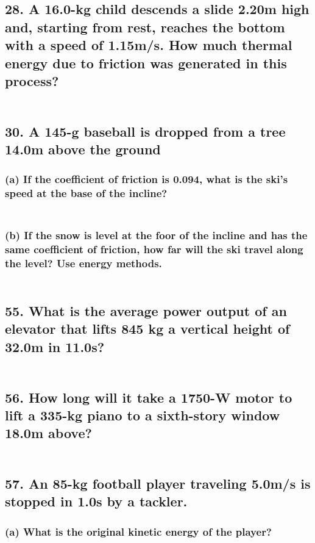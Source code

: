 \documentclass[12pt,a4paper,english]{article}
\begin{document}
\begin{flushleft}
  \subsection{28. A 16.0-kg child descends a slide 2.20m high and, starting from rest, reaches the bottom with a speed of 1.15m/s. How much thermal energy due to friction was generated in this process?}
  \begin{align*}
  \end{align*}
  \subsection{30. A 145-g baseball is dropped from a tree 14.0m above the ground}
  \subsubsection{(a) If the coefficient of friction is 0.094, what is the ski's speed at the base of the incline?}
  \begin{align*}
  \end{align*}
  \subsubsection{(b) If the snow is level at the foor of the incline and has the same coefficient of friction, how far will the ski travel along the level? Use energy methods.}
  \begin{align*}
  \end{align*}
  \subsection{55. What is the average power output of an elevator that lifts 845 kg a vertical height of 32.0m in 11.0s?}
  \begin{align*}
  \end{align*}
  \subsection{56. How long will it take a 1750-W motor to lift a 335-kg piano to a sixth-story window 18.0m above?}
  \begin{align*}
  \end{align*}
  \subsection{57. An 85-kg football player traveling 5.0m/s is stopped in 1.0s by a tackler.}
  \subsubsection{(a) What is the original kinetic energy of the player?}
  \begin{align*}
  \end{align*}

\end{flushleft}
\end{document}
